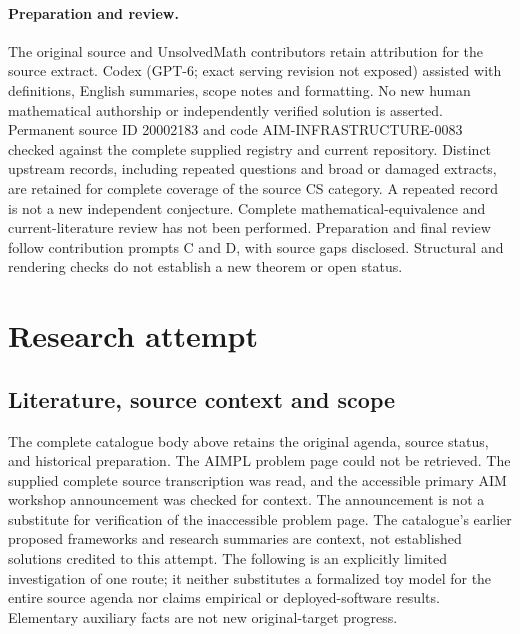 \documentclass[11pt]{article}
\begin{document}
\paragraph{Preparation and review.}
The original source and UnsolvedMath contributors retain attribution for the source extract. Codex (GPT-6; exact serving revision not exposed) assisted with definitions, English summaries, scope notes and formatting. No new human mathematical authorship or independently verified solution is asserted. Permanent source ID 20002183 and code AIM-INFRASTRUCTURE-0083 checked against the complete supplied registry and current repository. Distinct upstream records, including repeated questions and broad or damaged extracts, are retained for complete coverage of the source CS category. A repeated record is not a new independent conjecture. Complete mathematical-equivalence and current-literature review has not been performed. Preparation and final review follow contribution prompts C and D, with source gaps disclosed. Structural and rendering checks do not establish a new theorem or open status.
\label{end:20002183}

\section{Research attempt}
\subsection{Literature, source context and scope}
The complete catalogue body above retains the original agenda, source status, and historical preparation. The AIMPL problem page could not be retrieved. The supplied complete source transcription was read, and the accessible primary AIM workshop announcement was checked for context. The announcement is not a substitute for verification of the inaccessible problem page. The catalogue's earlier proposed frameworks and research summaries are context, not established solutions credited to this attempt. The following is an explicitly limited investigation of one route; it neither substitutes a formalized toy model for the entire source agenda nor claims empirical or deployed-software results. Elementary auxiliary facts are not new original-target progress.
\end{document}
